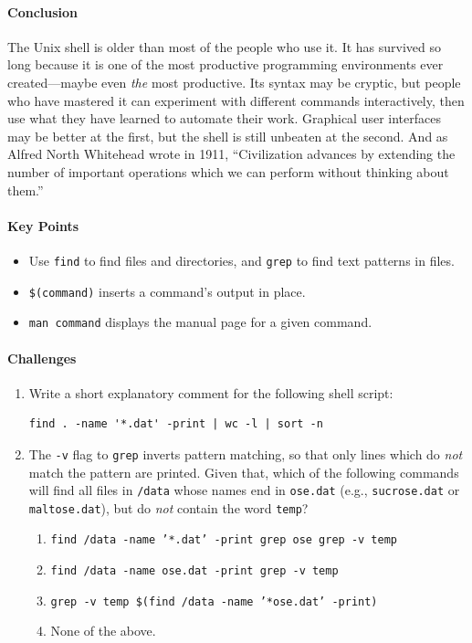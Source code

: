 \documentclass[]{book}
\begin{document}
\mbox{}\paragraph{Conclusion}

The Unix shell is older than most of the people who use it. It has
survived so long because it is one of the most productive programming
environments ever created---maybe even \emph{the} most productive. Its
syntax may be cryptic, but people who have mastered it can experiment
with different commands interactively, then use what they have learned
to automate their work. Graphical user interfaces may be better at the
first, but the shell is still unbeaten at the second. And as Alfred
North Whitehead wrote in 1911, ``Civilization advances by extending the
number of important operations which we can perform without thinking
about them.''

\mbox{}\paragraph{Key Points}

\begin{itemize}
\item
  Use \texttt{find} to find files and directories, and \texttt{grep} to
  find text patterns in files.
\item
  \texttt{\$(command)} inserts a command's output in place.
\item
  \texttt{man command} displays the manual page for a given command.
\end{itemize}

\mbox{}\paragraph{Challenges}

\begin{enumerate}
\item
  Write a short explanatory comment for the following shell script:

\begin{verbatim}
find . -name '*.dat' -print | wc -l | sort -n
\end{verbatim}
\item
  The \texttt{-v} flag to \texttt{grep} inverts pattern matching, so
  that only lines which do \emph{not} match the pattern are printed.
  Given that, which of the following commands will find all files in
  \texttt{/data} whose names end in \texttt{ose.dat} (e.g.,
  \texttt{sucrose.dat} or \texttt{maltose.dat}), but do \emph{not}
  contain the word \texttt{temp}?

  \begin{enumerate}
  \item
    \texttt{find /data -name '*.dat' -print \textbar{} grep ose \textbar{} grep -v temp}
  \item
    \texttt{find /data -name ose.dat -print \textbar{} grep -v temp}
  \item
    \texttt{grep -v temp \$(find /data -name '*ose.dat' -print)}
  \item
    None of the above.
  \end{enumerate}
\end{enumerate}
\end{document}
